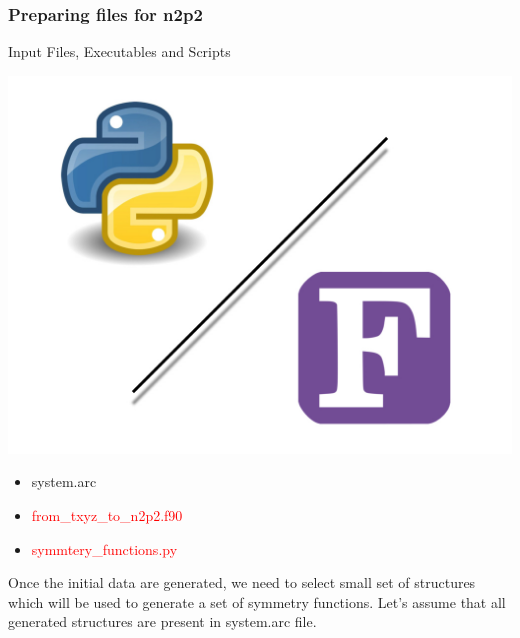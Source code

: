 \documentclass[12pt]{article}
\begin{document}
\subsubsection{Preparing files for n2p2}
\begin{mybox2}{{Input Files, Executables and Scripts}}
\begin{minipage}[c]{0.5\linewidth}
\includegraphics[scale=0.1]{Python-fortran.jpeg}
\end{minipage}
\begin{minipage}[c]{0.5\linewidth}
\begin{itemize}
    \item system.arc
    \item \textcolor{red}{from\_txyz\_to\_n2p2.f90}
    \item \textcolor{red}{symmtery\_functions.py}
\end{itemize}
\end{minipage}
\end{mybox2}
Once the initial data are generated, we need to select small set of structures which will be used to generate a set of symmetry functions.  
Let's assume that all generated structures are present in system.arc file. 
\end{document}
